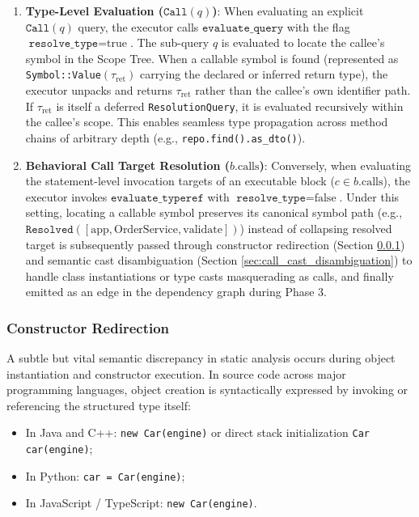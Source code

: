 \begin{enumerate}
  \item \textbf{Type-Level Evaluation ($\texttt{Call}(q)$)}: When
    evaluating an explicit
    $\texttt{Call}(q)$ query, the executor calls
    $\texttt{evaluate\_query}$ with the flag
    $\texttt{resolve\_type} = \text{true}$. The sub-query $q$ is
    evaluated to locate the callee's
    symbol in the Scope Tree. When a callable symbol is found
    (represented as \texttt{Symbol::}\-\texttt{Value}$(\tau_{\text{ret}})$
    carrying the declared or inferred return type), the executor
    unpacks and returns $\tau_{\text{ret}}$
    rather than the callee's own identifier path. If
    $\tau_{\text{ret}}$ is itself a deferred
    \texttt{ResolutionQuery}, it is evaluated recursively within the
    callee's scope.
    This enables seamless type propagation across method chains of
    arbitrary depth (e.g.,
    \texttt{repo.find().as\_dto()}).
  \item \textbf{Behavioral Call Target Resolution
    ($b.\text{calls}$)}: Conversely, when evaluating
    the statement-level invocation targets of an executable block ($c
    \in b.\text{calls}$),
    the executor invokes $\texttt{evaluate\_typeref}$ with
    $\texttt{resolve\_type} = \text{false}$.
    Under this setting, locating a callable symbol preserves its
    canonical symbol path
    (e.g., $\texttt{Resolved}([\text{app}, \text{OrderService},
    \text{validate}])$) instead of collapsing
    resolved target is subsequently passed through constructor
    redirection (Section \ref{sec:constructor_redirection}) and
    semantic cast disambiguation (Section
    \ref{sec:call_cast_disambiguation}) to handle class
    instantiations or type casts masquerading as calls, and finally
    emitted as an edge in the dependency graph during Phase 3.
\end{enumerate}

\subsubsection{Constructor Redirection}
\label{sec:constructor_redirection}

A subtle but vital semantic discrepancy in static analysis occurs during object
instantiation and constructor execution. In source code across major programming
languages, object creation is syntactically expressed by invoking or referencing
the structured type itself:
\begin{itemize}
  \item In Java and C++: \texttt{new Car(engine)} or direct stack initialization
    \texttt{Car car(engine)};
  \item In Python: \texttt{car = Car(engine)};
  \item In JavaScript / TypeScript: \texttt{new Car(engine)}.
\end{itemize}

